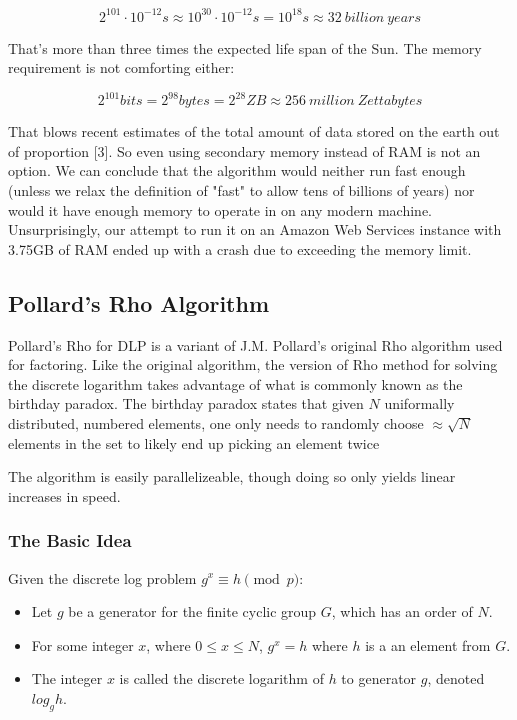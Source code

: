 \documentclass{article}
\begin{document}
      $$2^{101} \cdot 10^{-12}s \approx 10^{30} \cdot 10^{-12}s = 10^{18}s \approx 32\ billion\ years$$

      That's more than three times the expected life span of the Sun. The memory requirement is not comforting either:

      $$2^{101} bits = 2^{98} bytes = 2^{28} ZB \approx 256\ million\ Zettabytes$$

      That blows recent estimates of the total amount of data stored on the earth out of proportion [3]. So even using secondary memory instead of RAM is not an option. We can conclude that the algorithm would neither run fast enough (unless we relax the definition of "fast" to allow tens of billions of years) nor would it have enough memory to operate in on any modern machine. Unsurprisingly, our attempt to run it on an Amazon Web Services instance with 3.75GB of RAM ended up with a crash due to exceeding the memory limit.

      \subsection{Pollard's Rho Algorithm}

      Pollard's Rho for DLP is a variant of J.M. Pollard's original Rho algorithm used for factoring. Like the original algorithm, the version of Rho method for solving the discrete logarithm takes advantage of what is commonly known as the birthday paradox. The birthday paradox states that given $N$ uniformally distributed, numbered elements, one only needs to randomly choose $\approx\sqrt{N}$ elements in the set to likely end up picking an element twice \autocite{Pollard1974}

      The algorithm is easily parallelizeable, though doing so only yields linear increases in speed.

      \subsubsection{The Basic Idea}

      Given the discrete log problem $g^x \equiv h \pmod{p}$:

      \begin{itemize}

        \item Let $g$ be a generator for the finite cyclic group $G$, which has an order of $N$.

        \item For some integer $x$, where $0 \leq x \leq N$, $g^x = h$ where $h$ is a an element from $G$.

        \item The integer $x$ is called the discrete logarithm of $h$ to generator $g$, denoted $log_{g} h$.
      \end{itemize}
\end{document}
